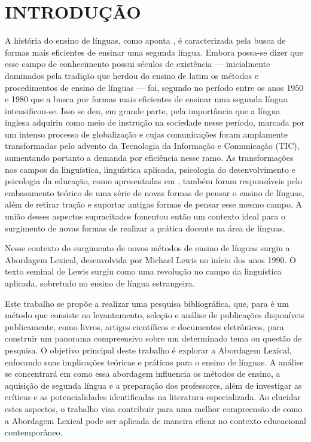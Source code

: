 \section{INTRODUÇÃO}

A história do ensino de línguas, como aponta , é caracterizada pela busca de formas mais eficientes de ensinar uma segunda língua. Embora possa-se dizer que esse campo de conhecimento possui séculos de existência — inicialmente dominados pela tradição que herdou do ensino de latim os métodos e procedimentos de ensino de línguas — foi, segundo no período entre os anos 1950 e 1980 que a busca por formas mais eficientes de ensinar uma segunda língua intensificou-se. Isso se deu, em grande parte, pela importância que a língua inglesa adquiriu como meio de instrução na sociedade nesse período, marcada por um intenso processo de globalização e cujas comunicações foram amplamente transformadas pelo advento da Tecnologia da Informação e Comunicação (TIC), aumentando portanto a demanda por eficiência nesse ramo. As transformações nos campos da linguística, linguística aplicada, psicologia do desenvolvimento e psicologia da educação, como apresentadas em , também foram responsáveis pelo embasamento teórico de uma série de novas formas de pensar o ensino de línguas, além de retirar tração e suportar antigas formas de pensar esse mesmo campo. A união desses aspectos supracitados fomentou então um contexto ideal para o surgimento de novas formas de realizar a prática docente na área de línguas. 

Nesse contexto do surgimento de novos métodos de ensino de línguas surgiu a Abordagem Lexical, desenvolvida por Michael Lewis no início dos anos 1990. O texto seminal de Lewis surgiu como uma revolução no campo da linguística aplicada, sobretudo no ensino de língua estrangeira. 

Este trabalho se propõe a realizar uma pesquisa bibliográfica, que, para  é  um método que consiste no levantamento, seleção e análise de publicações disponíveis publicamente, como livros, artigos científicos e documentos eletrônicos, para construir um panorama compreensivo sobre um determinado tema ou questão de pesquisa. O objetivo principal deste trabalho é explorar a Abordagem Lexical, enfocando suas implicações teóricas e práticas para o ensino de línguas. A análise se concentrará em como essa abordagem influencia os métodos de ensino, a aquisição de segunda língua e a preparação dos professores, além de investigar as críticas e as potencialidades identificadas na literatura especializada. Ao elucidar estes aspectos, o trabalho visa contribuir para uma melhor compreensão de como a Abordagem Lexical pode ser aplicada de maneira eficaz no contexto educacional contemporâneo.


